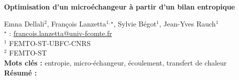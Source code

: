 


    \newpage


%
\begin{flushleft}
\addtocounter{section}{1}
{\Large \textbf{Optimisation d'un microéchangeur à partir d'un bilan entropique}}\label{ref:41}
\end{flushleft}
%
Emna Dellali$^{2}$, François Lanzetta$^{1,\star}$, Sylvie Bégot$^{1}$, Jean-Yves Rauch$^{1}$\\[2mm]
$^{\star}$ \Letter : \url{francois.lanzetta@univ-fcomte.fr}\\[2mm]
{\footnotesize $^{1}$ FEMTO-ST-UBFC-CNRS}\\
{\footnotesize $^{2}$ FEMTO-ST}\\
[4mm]
%
\noindent \textbf{Mots clés : } entropie, micro-échangeur, écoulement, transfert de chaleur\\[4mm]
%
\noindent \textbf{Résumé : } 

